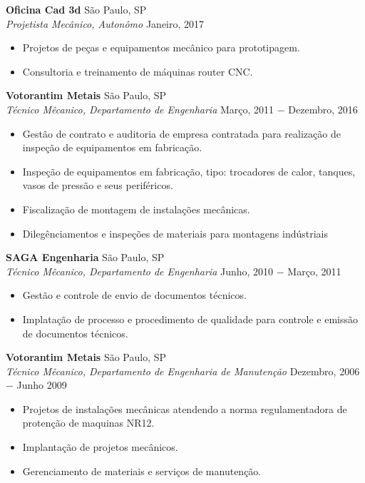 \documentclass{article}
\begin{document}
\noindent \textbf{Oficina Cad 3d} \hfill São Paulo, SP \\
\textit{Projetista Mecânico, Autonômo} \hfill Janeiro, 2017
\begin{itemize}[noitemsep,nolistsep,leftmargin=*]
\item {Projetos de peças e equipamentos mecânico para prototipagem.}
\item {Consultoria e treinamento de máquinas router CNC.\\}
\end{itemize}

\noindent \textbf{Votorantim Metais} \hfill São Paulo, SP \\
\textit{Técnico Mêcanico, Departamento de Engenharia} \hfill Março, 2011 $-$ Dezembro, 2016
\begin{itemize}[noitemsep,nolistsep,leftmargin=*]
\item {Gestão de contrato e auditoria de empresa contratada para realização de inspeção de equipamentos em fabricação.}
\item {Inspeção de equipamentos em fabricação, tipo: trocadores de calor, tanques, vasos de pressão e seus periféricos.}
\item {Fiscalização de montagem de instalações mecânicas.}
\item {Dilegênciamentos e inspeções de materiais para montagens indústriais\\}
\end{itemize}

\noindent \textbf{SAGA Engenharia} \hfill São Paulo, SP \\
\textit{Técnico Mêcanico, Departamento de Engenharia} \hfill Junho, 2010 $-$ Março, 2011
\begin{itemize}[noitemsep,nolistsep,leftmargin=*]
\item {Gestão e controle de envio de documentos técnicos.}
\item {Implatação de processo e procedimento de qualidade para controle e emissão de documentos técnicos.\\}
\end{itemize}

\noindent \textbf{Votorantim Metais} \hfill São Paulo, SP \\
\textit{Técnico Mêcanico, Departamento de Engenharia de Manutenção} \hfill Dezembro, 2006 $-$ Junho 2009
\begin{itemize}[noitemsep,nolistsep,leftmargin=*]
\item {Projetos de instalações mecânicas atendendo a norma regulamentadora de protenção de maquinas NR12.}
\item {Implantação de projetos mecânicos.}
\item {Gerenciamento de materiais e serviços de manutenção.} \\
\end{itemize}
\end{document}
